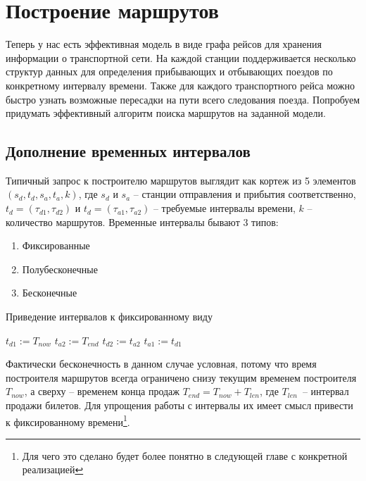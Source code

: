\section{Построение маршрутов}
Теперь у нас есть эффективная модель в виде графа рейсов для хранения информации о транспортной сети. На каждой станции поддерживается несколько структур данных для определения прибывающих и отбывающих поездов по конкретному интервалу времени. Также для каждого транспортного рейса можно быстро узнать возможные пересадки на пути всего следования поезда. Попробуем придумать эффективный алгоритм поиска маршрутов на заданной модели.

\subsection{Дополнение временных интервалов}
Типичный запрос к построителю маршрутов выглядит как кортеж из 5 элементов $(s_d, t_d, s_a, t_a, k)$, где $s_d$ и $s_a$ -- станции отправления и прибытия соответственно, $t_d=(\tau_{d1}, \tau_{d2})$ и $t_d=(\tau_{a1}, \tau_{a2})$ -- требуемые интервалы времени, $k$ -- количество маршрутов. Временные интервалы бывают 3 типов:
\begin{enumerate}
	\item Фиксированные
	\item Полубесконечные
	\item Бесконечные
\end{enumerate}

\begin{algorithm}[!h]
	\caption{Приведение интервалов к фиксированному виду}\label{lst5}
	\begin{algorithmic}
			\State $t_{d1} := T_{now}$
		\EndIf
			\State $t_{a2} := T_{end}$
		\EndIf
			\State $t_{d2} := t_{a2}$
		\EndIf
			\State $t_{a1} := t_{d1}$
		\EndIf
		\EndFunction
	\end{algorithmic}
\end{algorithm}

Фактически бесконечность в данном случае условная, потому что время построителя маршрутов всегда ограничено снизу текущим временем построителя $T_{now}$, а сверху -- временем конца продаж $T_{end} = T_{now} + T_{len}$, где $T_{len}$~-- интервал продажи билетов. Для упрощения работы с интервалы их имеет смысл привести к фиксированному времени\footnote{Для чего это сделано будет более понятно в следующей главе с конкретной реализацией}.
\FloatBarrier 

